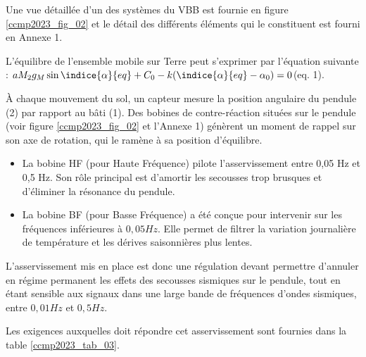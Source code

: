Une vue détaillée d'un des systèmes du VBB est fournie en figure \ref{ccmp2023_fig_02} et le détail des différents éléments qui le constituent est fourni en Annexe 1.

L’équilibre de l’ensemble mobile sur Terre peut s'exprimer par l'équation suivante : 
$ aM_2 g_M \sin\indice{\alpha}{eq} +C_0 - k( \indice{\alpha}{eq} -\alpha_0)=0 $(eq. 1).




\ifprof
\else
À chaque mouvement du sol, un capteur mesure la position angulaire du pendule (2) par rapport au bâti (1). Des bobines de contre-réaction situées sur le pendule (voir figure \ref{ccmp2023_fig_02} et l'Annexe 1) génèrent un moment de rappel sur son axe de rotation, qui le ramène à sa position d'équilibre.

\begin{itemize}
  \item La bobine HF (pour Haute Fréquence) pilote l'asservissement entre 0,05 Hz et 0,5 Hz. Son rôle principal est d'amortir les secousses trop brusques et d'éliminer la résonance du pendule.
  \item La bobine BF (pour Basse Fréquence) a été conçue pour intervenir sur les fréquences inférieures à $0,05 \si{Hz}$. Elle permet de filtrer la variation journalière de température et les dérives saisonnières plus lentes.
\end{itemize}

L'asservissement mis en place est donc une régulation devant permettre d'annuler en régime permanent les effets des secousses sismiques sur le pendule, tout en étant sensible aux signaux dans une large bande de fréquences d'ondes sismiques, entre $0,01 \si{Hz}$ et $0,5 \si{Hz}$.

Les exigences auxquelles doit répondre cet asservissement sont fournies dans la table \ref{ccmp2023_tab_03}.

